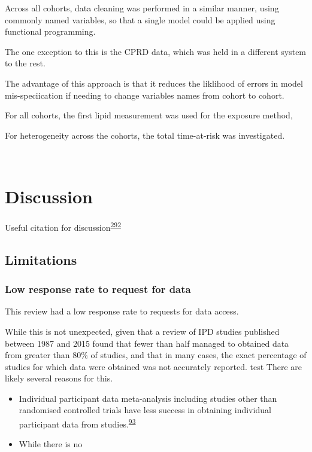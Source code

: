 \documentclass[a4paper, twoside]{templates/ociamthesis}
\begin{document}
Across all cohorts, data cleaning was performed in a similar manner, using commonly named variables, so that a single model could be applied using functional programming.

The one exception to this is the CPRD data, which was held in a different system to the rest.

The advantage of this approach is that it reduces the liklihood of errors in model mis-speciication if needing to change variables names from cohort to cohort.

For all cohorts, the first lipid measurement was used for the exposure method,

For heterogeneity across the cohorts, the total time-at-risk was investigated.

~

\hypertarget{discussion-3}{%
\section{Discussion}\label{discussion-3}}

Useful citation for discussion\textsuperscript{\protect\hyperlink{ref-levis2021}{292}}

\hypertarget{limitations-1}{%
\subsection{Limitations}\label{limitations-1}}

\hypertarget{low-response-rate-to-request-for-data}{%
\subsubsection{Low response rate to request for data}\label{low-response-rate-to-request-for-data}}

This review had a low response rate to requests for data access.

While this is not unexpected, given that a review of IPD studies published between 1987 and 2015 found that fewer than half managed to obtained data from greater than 80\% of studies, and that in many cases, the exact percentage of studies for which data were obtained was not accurately reported.
test
There are likely several reasons for this.

\begin{itemize}
\item
  Individual participant data meta-analysis including studies other than randomised controlled trials have less success in obtaining individual participant data from studies.\textsuperscript{\protect\hyperlink{ref-nevitt2017a}{93}}
\item
  While there is no
\end{itemize}
\end{document}
